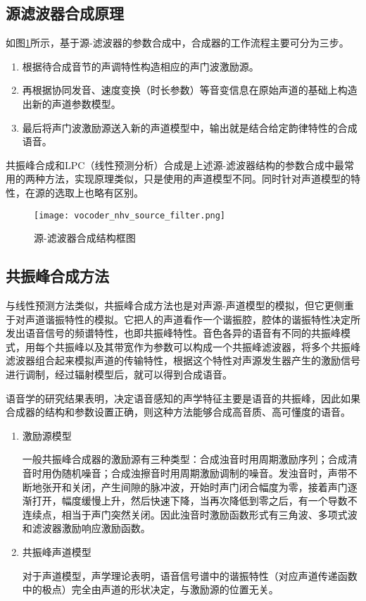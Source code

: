 \documentclass[cn,10pt,math=newtx,citestyle=gb7714-2015,bibstyle=gb7714-2015]{elegantbook}
\begin{document}
\subsection{源滤波器合成原理}

如图\ref{fig:vocoder_nhv_source_filter}所示，基于源-滤波器的参数合成中，合成器的工作流程主要可分为三步。

\begin{enumerate}
  \item 根据待合成音节的声调特性构造相应的声门波激励源。
  \item 再根据协同发音、速度变换（时长参数）等音变信息在原始声道的基础上构造出新的声道参数模型。
  \item 最后将声门波激励源送入新的声道模型中，输出就是结合给定韵律特性的合成语音。
\end{enumerate}

共振峰合成和LPC（线性预测分析）合成是上述源-滤波器结构的参数合成中最常用的两种方法，实现原理类似，只是使用的声道模型不同。同时针对声道模型的特性，在源的选取上也略有区别。

\begin{figure}[htbp]
  \centering
  \texttt{[image: vocoder\_nhv\_source\_filter.png]}
  \caption{源-滤波器合成结构框图 \label{fig:vocoder_nhv_source_filter}}
\end{figure}

\subsection{共振峰合成方法}

与线性预测方法类似，共振峰合成方法也是对声源-声道模型的模拟，但它更侧重于对声道谐振特性的模拟。它把人的声道看作一个谐振腔，腔体的谐振特性决定所发出语音信号的频谱特性，也即共振峰特性。音色各异的语音有不同的共振峰模式，用每个共振峰以及其带宽作为参数可以构成一个共振峰滤波器，将多个共振峰滤波器组合起来模拟声道的传输特性，根据这个特性对声源发生器产生的激励信号进行调制，经过辐射模型后，就可以得到合成语音。

语音学的研究结果表明，决定语音感知的声学特征主要是语音的共振峰，因此如果合成器的结构和参数设置正确，则这种方法能够合成高音质、高可懂度的语音。

\begin{enumerate}
  \item 激励源模型
  
  一般共振峰合成器的激励源有三种类型：合成浊音时用周期激励序列；合成清音时用伪随机噪音；合成浊擦音时用周期激励调制的噪音。发浊音时，声带不断地张开和关闭，产生间隙的脉冲波，开始时声门闭合幅度为零，接着声门逐渐打开，幅度缓慢上升，然后快速下降，当再次降低到零之后，有一个导数不连续点，相当于声门突然关闭。因此浊音时激励函数形式有三角波、多项式波和滤波器激励响应激励函数。

  \item 共振峰声道模型
  
  对于声道模型，声学理论表明，语音信号谱中的谐振特性（对应声道传递函数中的极点）完全由声道的形状决定，与激励源的位置无关。
\end{enumerate}
\end{document}
